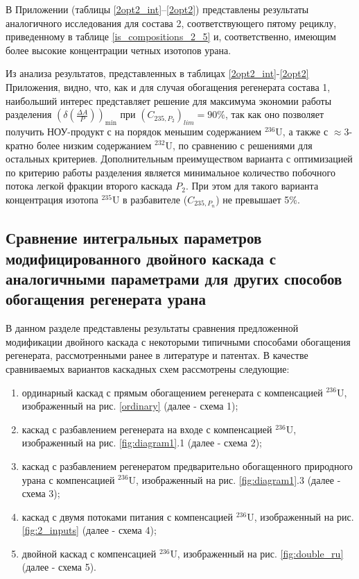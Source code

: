 В Приложении (таблицы \ref{2opt2_int}--\ref{2opt2}) представлены результаты аналогичного исследования для состава 2, соответствующего пятому рециклу, приведенному в таблице \ref{is_compositions_2_5} и, соответственно, имеющим более высокие концентрации четных изотопов урана.


Из анализа результатов, представленных в таблицах \ref{2opt2_int}-\ref{2opt2} Приложения, видно, что, как и для случая обогащения регенерата состава 1, наибольший интерес представляет решение для максимума экономии работы разделения $(\delta(\frac{\Delta A}{P}))_\text{min}$ при $({C_{235,{P_2}}})_{lim}=90\%$, так как оно позволяет получить НОУ-продукт с на порядок меньшим содержанием $^{236}$U, а также с $\approx$3-кратно более низким содержанием $^{232}$U, по сравнению с решениями для остальных критериев.
Дополнительным преимуществом варианта с оптимизацией по критерию работы разделения является минимальное количество побочного потока легкой фракции второго каскада $P_2$. 
При этом для такого варианта концентрация изотопа $^{235}$U в разбавителе ($C_{235,P_{n}}$) не превышает 5\%.

\subsection{Сравнение интегральных параметров модифицированного двойного каскада с аналогичными параметрами для других способов обогащения регенерата урана}\label{integral_comp}

В данном разделе представлены результаты сравнения предложенной модификации двойного каскада с некоторыми типичными способами обогащения регенерата, рассмотренными ранее в литературе и патентах. В качестве сравниваемых вариантов каскадных схем рассмотрены следующие: 

\begin{enumerate}
    \item ординарный каскад с прямым обогащением регенерата с компенсацией $^{236}$U, изображенный на рис. \ref{ordinary} (далее - схема 1);
    \item каскад с разбавлением регенерата на входе с компенсацией $^{236}$U, изображенный на рис. \ref{fig:diagram1}.1 (далее - схема 2);
    \item каскад с разбавлением регенератом предварительно обогащенного природного урана с компенсацией $^{236}$U, изображенный на рис. \ref{fig:diagram1}.3 (далее - схема 3);
    \item каскад с двумя потоками питания с компенсацией $^{236}$U, изображенный на рис. \ref{fig:2_inputs} (далее - схема 4);
    \item двойной каскад с компенсацией $^{236}$U, изображенный на рис. \ref{fig:double_ru} (далее - схема 5).
\end{enumerate}


